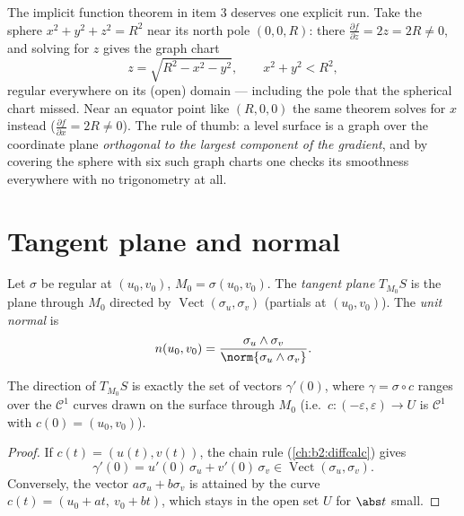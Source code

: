 \begin{example}
\label{ex:b2:surfaces:levelgraph}
The implicit function theorem in item 3 deserves one explicit
run. Take the sphere $x^2 + y^2 + z^2 = R^2$ near its north
pole $(0, 0, R)$: there $\frac{\partial f}{\partial z} = 2z =
2R \neq 0$, and solving for $z$ gives the graph chart
\[
z = \sqrt{R^2 - x^2 - y^2},
\qquad x^2 + y^2 < R^2 ,
\]
regular everywhere on its (open) domain --- including the
pole that the spherical chart missed. Near an equator point
like $(R, 0, 0)$ the same theorem solves for $x$ instead
($\frac{\partial f}{\partial x} = 2R \neq 0$). The rule of
thumb: a level surface is a graph over the coordinate plane
\emph{orthogonal to the largest component of the gradient},
and by covering the sphere with six such graph charts one
checks its smoothness everywhere with no trigonometry at
all.
\end{example}

\section{Tangent plane and normal}

\begin{definition}\label{def:b2:surfaces:tangent}
Let $\sigma$ be regular at $(u_0, v_0)$, $M_0 = \sigma(u_0, v_0)$.
The \emph{tangent plane} $T_{M_0}S$ is the plane through $M_0$
directed by $\operatorname{Vect}(\sigma_u, \sigma_v)$ (partials at
$(u_0, v_0)$). The \emph{unit normal} is
\[
n(u_0, v_0)
= \frac{\sigma_u \wedge \sigma_v}
       {\norm{\sigma_u \wedge \sigma_v}} .
\]
\end{definition}

\begin{proposition}\label{prop:b2:surfaces:velocity}
The direction of $T_{M_0}S$ is exactly the set of vectors
$\gamma'(0)$, where $\gamma = \sigma \circ c$ ranges over the
$\mathcal{C}^1$ curves drawn on the surface through $M_0$ (i.e.\
$c \colon (-\varepsilon, \varepsilon) \to U$ is $\mathcal{C}^1$
with $c(0) = (u_0, v_0)$).
\end{proposition}

\begin{proof}
If $c(t) = (u(t), v(t))$, the chain rule
(\cref{ch:b2:diffcalc}) gives
\[
\gamma'(0) = u'(0)\,\sigma_u + v'(0)\,\sigma_v
\in \operatorname{Vect}(\sigma_u, \sigma_v).
\]
Conversely, the vector $a\sigma_u + b\sigma_v$ is attained by the
curve $c(t) = (u_0 + at,\ v_0 + bt)$, which stays in the open set
$U$ for $\abs t$ small.
\end{proof}


